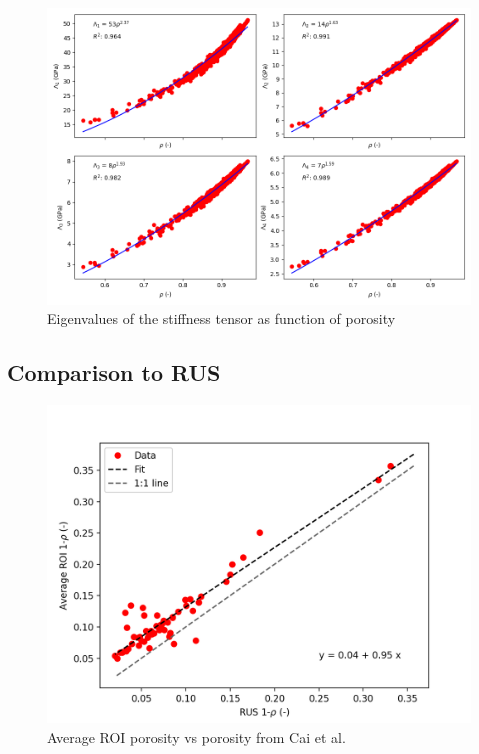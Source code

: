 \documentclass[a4paper,fleqn]{DC_ArtStyle}
\begin{document}
	\begin{figure}
		\centering
			\includegraphics[width=\linewidth]{../Results/LambdaVSRho}
			\caption{Eigenvalues of the stiffness tensor as function of porosity}
	\end{figure}


	\clearpage
	\subsection{Comparison to RUS}

	\begin{figure}[!h]
		\centering
			\includegraphics[height=\linewidth]{../Results/ExpSim_Rho}
			\caption{Average ROI porosity vs porosity from Cai et al.}
	\end{figure}
\end{document}
